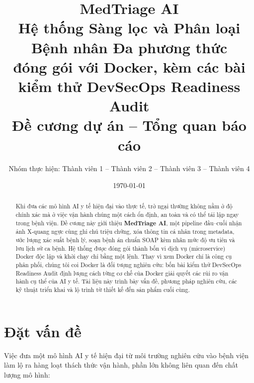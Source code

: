 \documentclass[11pt,a4paper]{article}
\title{\textbf{MedTriage AI}\\[4pt]
\large Hệ thống Sàng lọc và Phân loại Bệnh nhân Đa phương thức\\
đóng gói với Docker, kèm các bài kiểm thử DevSecOps Readiness Audit\\[4pt]
\normalsize Đề cương dự án -- Tổng quan báo cáo}
\author{Nhóm thực hiện: Thành viên 1 -- Thành viên 2 -- Thành viên 3 -- Thành viên 4}
\date{\today}
\begin{document}
\maketitle

\begin{abstract}
Khi đưa các mô hình AI y tế hiện đại vào thực tế, trở ngại thường không nằm ở độ chính xác mà ở việc vận hành chúng một cách ổn định, an toàn và có thể tái lập ngay trong bệnh viện. Đề cương này giới thiệu \textbf{MedTriage AI}, một pipeline đầu--cuối nhận ảnh X-quang ngực cùng ghi chú triệu chứng, xóa thông tin cá nhân trong metadata, ước lượng xác suất bệnh lý, soạn bệnh án chuẩn SOAP kèm nhãn mức độ ưu tiên và lưu lịch sử ca bệnh. Hệ thống được đóng gói thành bốn vi dịch vụ (microservice) Docker độc lập và khởi chạy chỉ bằng một lệnh. Thay vì xem Docker chỉ là công cụ phân phối, chúng tôi coi Docker là đối tượng nghiên cứu: bốn bài kiểm thử DevSecOps Readiness Audit định lượng cách từng cơ chế của Docker giải quyết các rủi ro vận hành cụ thể của AI y tế. Tài liệu này trình bày vấn đề, phương pháp nghiên cứu, các kỹ thuật triển khai và lộ trình từ thiết kế đến sản phẩm cuối cùng.
\end{abstract}

\tableofcontents
\bigskip

\section{Đặt vấn đề}
Việc đưa một mô hình AI y tế hiện đại từ môi trường nghiên cứu vào bệnh viện làm lộ ra hàng loạt thách thức vận hành, phần lớn không liên quan đến chất lượng mô hình:
\end{document}
